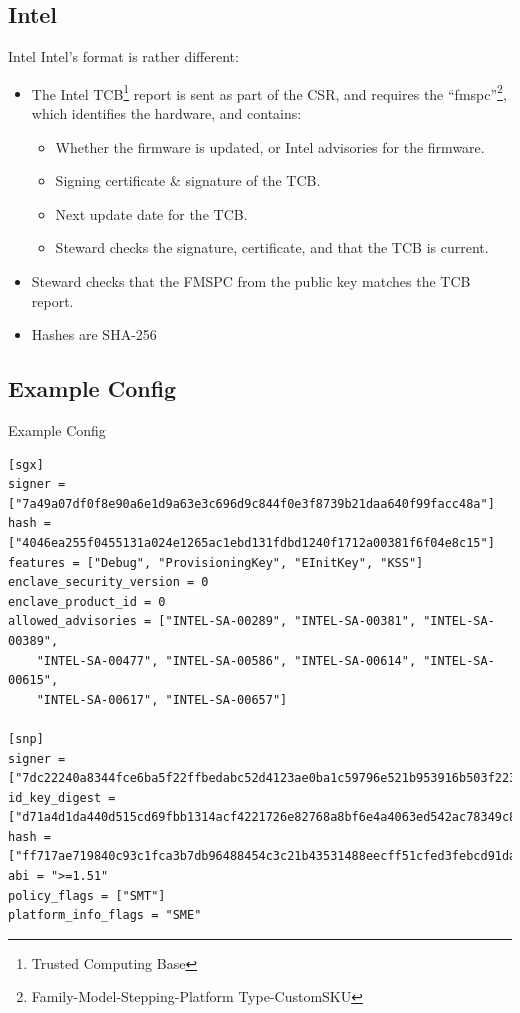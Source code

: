 \documentclass[graphics]{beamer}
\begin{document}
\subsection{Intel}
\begin{frame}{Intel}
Intel's format is rather different:
\begin{itemize}
    \item The Intel TCB\footnote{Trusted Computing Base} report is sent as part of the CSR, and requires the ``fmspc''\footnote{Family-Model-Stepping-Platform Type-CustomSKU}, which identifies the hardware, and contains:
    \begin{itemize}
        \item Whether the firmware is updated, or Intel advisories for the firmware.
        \item Signing certificate \& signature of the TCB.
        \item Next update date for the TCB.
        \item Steward checks the signature, certificate, and that the TCB is current.
    \end{itemize}
    \item Steward checks that the FMSPC from the public key matches the TCB report.
    \item Hashes are SHA-256
\end{itemize}
\end{frame}

\subsection{Example Config}
\begin{frame}[fragile]{Example Config}
    \begin{verbatim}
[sgx]
signer = ["7a49a07df0f8e90a6e1d9a63e3c696d9c844f0e3f8739b21daa640f99facc48a"]
hash = ["4046ea255f0455131a024e1265ac1ebd131fdbd1240f1712a00381f6f04e8c15"]
features = ["Debug", "ProvisioningKey", "EInitKey", "KSS"]
enclave_security_version = 0
enclave_product_id = 0
allowed_advisories = ["INTEL-SA-00289", "INTEL-SA-00381", "INTEL-SA-00389",
    "INTEL-SA-00477", "INTEL-SA-00586", "INTEL-SA-00614", "INTEL-SA-00615",
    "INTEL-SA-00617", "INTEL-SA-00657"]

[snp]
signer = ["7dc22240a8344fce6ba5f22ffbedabc52d4123ae0ba1c59796e521b953916b503f223b15c4429e7d8c5489ad71f1e193"]
id_key_digest = ["d71a4d1da440d515cd69fbb1314acf4221726e82768a8bf6e4a4063ed542ac78349c8145b4666a4242a91a374387b473"]
hash = ["ff717ae719840c93c1fca3b7db96488454c3c21b43531488eecff51cfed3febcd91da8be87a4cbcbc52a3bae770987c3"]
abi = ">=1.51"
policy_flags = ["SMT"]
platform_info_flags = "SME"
    \end{verbatim}
\end{frame}
\end{document}
